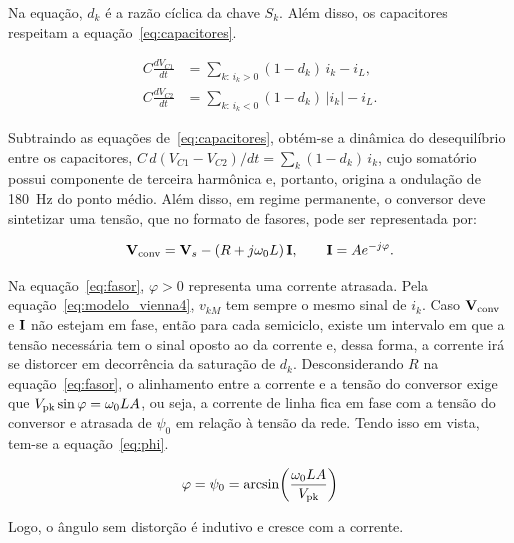 Na equação, $d_k$ é a razão cíclica da chave $S_k$. Além disso, os capacitores respeitam a
equação~\eqref{eq:capacitores}.

\begin{equation}
    \begin{aligned}
        C\frac{dV_{C1}}{dt} &= \sum_{k:\,i_k>0}(1-d_k)\,i_k-i_L,\\
        C\frac{dV_{C2}}{dt} &= \sum_{k:\,i_k<0}(1-d_k)\,\lvert i_k\rvert-i_L.
    \end{aligned}
    \label{eq:capacitores}
\end{equation}

Subtraindo as equações de~\eqref{eq:capacitores}, obtém-se a dinâmica do desequilíbrio entre os capacitores, $C\,d(V_{C1}-V_{C2})/dt=\sum_{k}(1-d_k)\,i_k$, cujo somatório possui componente de terceira harmônica e, portanto, origina a ondulação de \SI{180}{Hz} do ponto médio.
Além disso, em regime permanente, o conversor deve sintetizar uma tensão, que no formato de fasores, pode ser representada por:

\begin{equation}
    \mathbf{V}_{\mathrm{conv}} = \mathbf{V}_s - (R + j\omega_0 L)\,\mathbf{I}, \qquad \mathbf{I} = A e^{-j\varphi}.
    \label{eq:fasor}
\end{equation}

Na equação~\eqref{eq:fasor}, $\varphi>0$ representa uma corrente atrasada. Pela equação~\eqref{eq:modelo_vienna4}, $v_{kM}$ tem sempre o mesmo sinal de $i_k$. Caso $\mathbf{V}_{\mathrm{conv}}$ e $\mathbf{I}$ não estejam em fase,
então para cada semiciclo, existe um intervalo em que a tensão necessária tem o sinal oposto ao da corrente
e, dessa forma, a corrente irá se distorcer em decorrência da saturação de $d_k$. Desconsiderando $R$ na equação~\eqref{eq:fasor}, o alinhamento
entre a corrente e a tensão do conversor exige que $V_{\mathrm{pk}}\sin\varphi = \omega_{0}LA$, ou seja, a corrente de linha fica em fase com a tensão do conversor e atrasada de $\psi_0$ em relação à tensão da rede.
Tendo isso em vista, tem-se a equação~\eqref{eq:phi}.

\begin{equation}
    \varphi = \psi_0 = \arcsin\!\left(\frac{\omega_0 L A}{V_{\mathrm{pk}}}\right)
    \label{eq:phi}
\end{equation}

Logo, o ângulo sem distorção é indutivo e cresce com a corrente.
